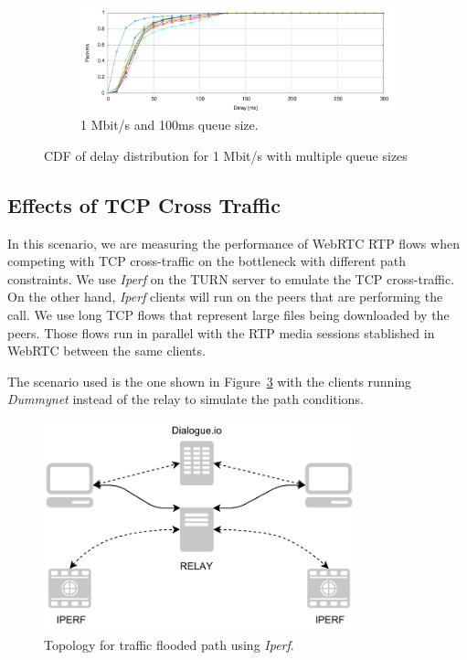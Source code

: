 \begin{figure}[htp]
        \begin{subfigure}[h]{1\textwidth}
                \centering
                \includegraphics[width=\textwidth]{./figures/1mb_01s_total_delay_distribution.pdf}
      \caption[1 Mbit/s and 100ms queue size]{1 Mbit/s and 100ms queue size.}
	\label{fig:1mb_01s_total_delay_distribution}
        \end{subfigure}
        \caption[CDF of delay distribution for 1 Mbit/s with multiple queue sizes]{CDF of delay distribution for 1 Mbit/s with multiple queue sizes}
        \label{fig:1mb_total_delay_distribution}
\end{figure}


\clearpage
\clearpage
\subsection{Effects of TCP Cross Traffic}

In this scenario, we are measuring the performance of WebRTC RTP flows when competing with TCP cross-traffic on the bottleneck with different path constraints. We use {\it Iperf} on the TURN server to emulate the TCP cross-traffic. On the other hand, {\it Iperf} clients will run on the peers that are performing the call. We use long TCP flows that represent large files being downloaded by the peers. Those flows run in parallel with the RTP media sessions stablished in WebRTC between the same clients.

The scenario used is the one shown in Figure~\ref{fig:iperfTest} with the clients running {\it Dummynet} instead of the relay to simulate the path conditions.

 \begin{figure}[h]
  \centering
    \includegraphics[width=0.8\textwidth]{./figures/IPERF.pdf}
      \caption[Topology for traffic flooded path using {\it Iperf}]{Topology for traffic flooded path using {\it Iperf}.}
	\label{fig:iperfTest}
\end{figure}

